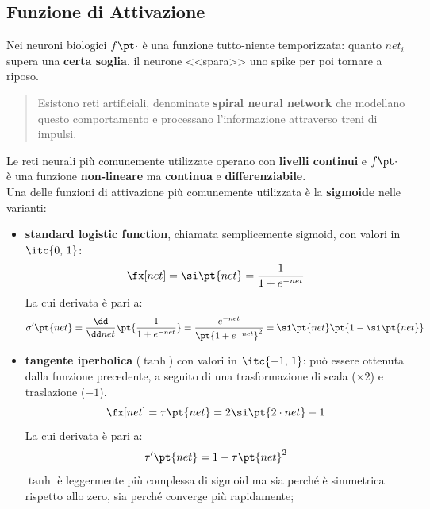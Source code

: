\subsection{Funzione di Attivazione}\label{sub:neur_funzione_di_attivazione} %
Nei neuroni biologici $f\pt \cdot$ è una funzione tutto-niente temporizzata: quanto $net_i$ supera una \textbf{certa soglia}, il neurone <<spara>> uno spike per poi tornare a riposo.
\begin{quote}
    Esistono reti artificiali, denominate \textbf{spiral neural network} che modellano questo comportamento e processano l'informazione attraverso treni di impulsi.
\end{quote}
Le reti neurali più comunemente utilizzate operano con \textbf{livelli continui} e $f\pt\cdot$ è una funzione \textbf{non-lineare} ma \textbf{continua} e \textbf{differenziabile}.
\\
Una delle funzioni di attivazione più comunemente utilizzata è la \textbf{sigmoide} nelle varianti:
\begin{itemize}
    \item \textbf{standard logistic function}, chiamata semplicemente sigmoid, con valori in $\itc{0,\,1}$:
        \[
            \fx[net] = \si\pt{net} = \frac{1}{1 + e^{-net}}
        \]
        La cui derivata è pari a:
        \[
            \sigma'\pt{net} = \frac{\dd}{\dd net}\pt{\frac{1}{1 + e^{-net}}} = \frac{e^{-net}}{\pt{1 + e^{-net}}^2} = \si\pt{net}\pt{1- \si\pt{net}}
        \]
    \item \textbf{tangente iperbolica} ($\tanh$) con valori in $\itc{-1,\,1}$: può essere ottenuta dalla funzione precedente, a seguito di una trasformazione di scala ($\times 2$) e traslazione ($-1$).
        \[
            \fx[net] = \tau\pt{net} = 2\si\pt{2 \cdot net} - 1
        \]
        La cui derivata è pari a:
        \[
            \tau'\pt{net} = 1 - \tau\pt{net}^2
        \]
        $\tanh$ è leggermente più complessa di sigmoid ma  sia perché è simmetrica rispetto allo zero, sia perché converge più rapidamente;
\end{itemize}
%
